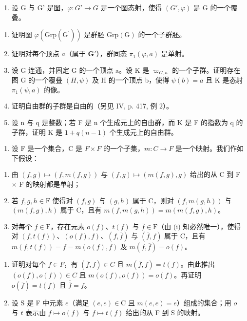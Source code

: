 \begin{enumerate}
\def\labelenumi{\arabic{enumi})}
\setcounter{enumi}{8}
\tightlist
\item
  设 G 与 G' 是图，\(\varphi\colon G'\to G\) 是一个图态射，使得 \((G',\varphi)\) 是 G 的一个覆叠。
\end{enumerate}

\begin{enumerate}
\def\labelenumi{\alph{enumi})}
\item
  证明图 \(\varphi(\mathrm{Grp}(\mathrm{G}^{\prime}))\) 是群胚 \(\mathrm{Grp}(\mathrm{G})\) 的一个子群胚。
\item
  证明对每个顶点 \(a\)（属于 \(\mathbf{G}'\)），群同态 \(\pi_1(\varphi, a)\) 是单射。
\item
  设 G 连通，并固定 G 的一个顶点 a。设 K 是 \(\varpi_{G,a}\) 的一个子群。证明存在图 G 的一个覆叠 \((H,\psi)\) 及 H 的一个顶点 b，使得 \(\psi(b)=a\) 且 K 是态射 \(\pi_{1}(\psi,a)\) 的像。
\item
  证明自由群的子群是自由的（另见 IV, p. 417, 例 2）。
\item
  设 n 与 q 是整数；若 F 是 n 个生成元上的自由群，而 K 是 F 的指数为 q 的子群，证明 K 是 \(1 + q(n - 1)\) 个生成元上的自由群。
\end{enumerate}

\begin{enumerate}
\def\labelenumi{\arabic{enumi})}
\setcounter{enumi}{9}
\tightlist
\item
  设 F 是一个集合，C 是 \(F \times F\) 的一个子集，\(m: C \to F\) 是一个映射。我们作如下假设：
\end{enumerate}

\begin{enumerate}
\def\labelenumi{(\roman{enumi})}
\item
  由 \((f,g)\mapsto(f,m(f,g))\) 与 \((f,g)\mapsto(m(f,g),g)\) 给出的从 C 到 F × F 的映射都是单射；
\item
  若 \(f, g, h \in \mathrm{F}\) 使得对 \((f, g)\) 与 \((g, h)\) 属于 C，则对 \((f, m(g, h))\) 与 \((m(f, g), h)\) 属于 C，且有 \(m(f, m(g, h)) = m(m(f, g), h)\)。
\item
  对每个 \(f \in \mathrm{F}\)，存在元素 \(o(f)\)、\(t(f)\) 与 \(\overline{f} \in \mathrm{F}\)（由 (i) 知必然唯一），使得对 \((f, t(f))\)、\((o(f), f)\)、\((f, \overline{f})\) 与 \((\overline{f}, f)\) 属于 C，且有 \(m(f, t(f)) = f = m(o(f), f)\) 及 \(m(f, \overline{f}) = o(f)\)。
\end{enumerate}

\begin{enumerate}
\def\labelenumi{\alph{enumi})}
\item
  证明对每个 \(f \in F\)，有 \((\overline{f}, f) \in C\) 且 \(m(\overline{f}, f) = t(f)\)。由此推出 \((o(f), o(f)) \in C\) 且 \(m(o(f), o(f)) = o(f)\)。再证明 \(o(\overline{f}) = t(f)\) 且 \(\overline{\overline{f}} = f\)。
\item
  设 S 是 F 中元素 \(e\)（满足 \((e,e)\in\mathrm{C}\) 且 \(m(e,e)=e\)）组成的集合；用 \(o\) 与 \(t\) 表示由 \(f\mapsto o(f)\) 与 \(f\mapsto t(f)\) 给出的从 F 到 S 的映射。
\end{enumerate}

